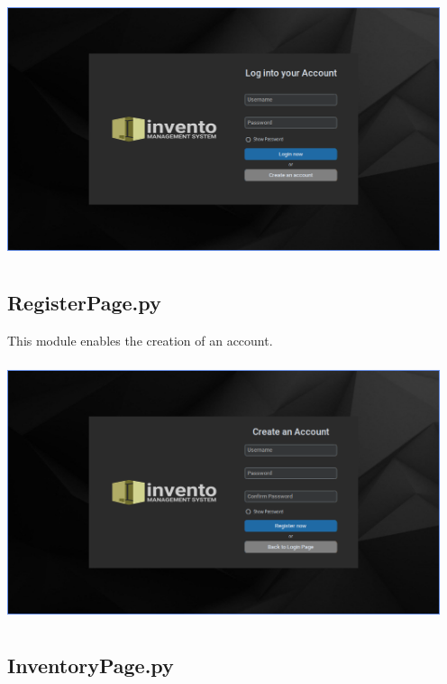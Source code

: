 \documentclass[12pt,a4paper]{article}
\begin{document}
            \begin{center}
              \includegraphics[width=5in,height=3in]{Login.png}
            \end{center}

        \subsection*{\normalfont{\faCode{}} \textbf{RegisterPage.py}}

            \index This module enables the creation of an account.

            \begin{center}
                \includegraphics[width=5in,height=3in]{Register.png}
            \end{center}

        \subsection*{\normalfont{\faCode{}} \textbf{InventoryPage.py}}
\end{document}
